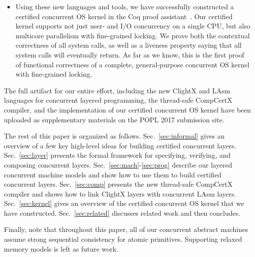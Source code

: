 {\begin{itemize}
  ClightX (a C variant) and LAsm (an x86 assembly language) by
  \citet{dscal15} with support for concurrent layered programming.  We
  have also developed a new {\em thread-safe} version of the CompCertX
  compiler that can compile certified concurrent ClightX layers into
  LAsm layers.  To support certified parallel composition of
  thread-modular layers (i.e., $L[t]$ for all $t$), we have developed
  a new extended algebraic memory model (for CompCertX) whereby stack
  frames allocated for each thread can be combined to form a single
  coherent CompCert-style memory.
\item Using these new languages and tools, we have successfully
  constructed a certified concurrent OS kernel in the Coq proof
  assistant~\cite{coq}. Our certified kernel supports not just user-
  and I/O concurrency on a single CPU, but also multicore parallelism
  with fine-grained locking. We prove both the contextual
  correctness of all system calls, as well as a liveness property 
  saying that all system calls will eventually return.  As far as we 
  know, this is the first proof of functional correctness of a complete,
  general-purpose concurrent OS kernel with fine-grained locking.
\end{itemize}

The full artifact for our entire effort, including the new ClightX and
LAsm languages for concurrent layered programming, the thread-safe
CompCertX compiler, and the implementation of our certified concurrent
OS kernel have been uploaded as supplementary materials on the POPL
2017 submission site.

The rest of this paper is organized as follows.
Sec.~\ref{sec:informal} gives an overview of a few key high-level
ideas for building certified concurrent layers.  Sec.~\ref{sec:layer}
presents the formal framework for specifying, verifying, and composing
concurrent layers.  Sec.~\ref{sec:mach}-\ref{sec:prog}
describe our layered concurrent machine models and  
show how to use them to build certified
concurrent layers.  Sec.~\ref{sec:comp} presents the new thread-safe
CompCertX compiler and shows how to link ClightX layers
with concurrent LAsm layers.  Sec.~\ref{sec:kernel} gives an overview
of the certified concurrent OS kernel that we have constructed.
Sec.~\ref{sec:related} discusses related work and then concludes.

Finally, note that throughout this paper, all of our concurrent 
abstract machines assume strong sequential consistency for atomic 
primitives. Supporting relaxed memory models is left as future work. 


}
